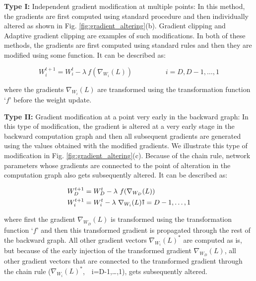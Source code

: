 \documentclass[runningheads]{llncs}
\begin{document}
\textbf{Type I:} Independent gradient modification at multiple points: In this method,
the gradients are first computed using standard procedure and then individually altered
as shown in Fig. \ref{fig:gradient_altering}(b). Gradient clipping
\cite{pascanu2013difficulty} and Adaptive gradient clipping \cite{brock2021high} are
examples of such modifications. In both of these methods, the gradients are first
computed using standard rules and then they are modified using some function. It can be
described as:

\begin{equation}
W_i^{t+1} = W_i^t - \lambda\ f(\nabla_{W_i}(L))
\hspace{2cm}
i=D,D-1,\ldots,1
\end{equation}

where the gradients $\nabla_{W_i}(L)$ are transformed using the transformation function
`$f$' before the weight update.

\textbf{Type II:} Gradient modification at a point very early in the backward graph: In
this type of modification, the gradient is altered at a very early stage in the backward
computation graph and then all subsequent gradients are generated using the values
obtained with the modified gradients. We illustrate this type of modification in Fig.
\ref{fig:gradient_altering}(c). Because of the chain rule, network parameters whose
gradients are connected to the point of alteration in the computation graph also gets
subsequently altered. It can be described as:

\begin{align}
W_D^{t+1} &= W_D^t - \lambda\ f(\nabla_{W_D}(L)) & \\
W_i^{t+1} &= W_i^t - \lambda\ \nabla_{W_i}(L)^{*} &\hspace{-1cm} i=D-1,\ldots,1
\end{align}

where first the gradient $\nabla_{W_D}(L)$ is transformed using the transformation
function `$f$' and then this transformed gradient is propagated through the rest of the
backward graph. All other gradient vectors $\nabla_{W_i}(L)^{*}$ are computed as is, but
because of the early injection of the transformed gradient $\nabla_{W_D}(L)$, all other
gradient vectors that are connected to the transformed gradient through the chain rule
($\nabla_{W_i}(L)^{*}$,\ \ i=D-1,\ldots,1), gets subsequently altered.
\end{document}
